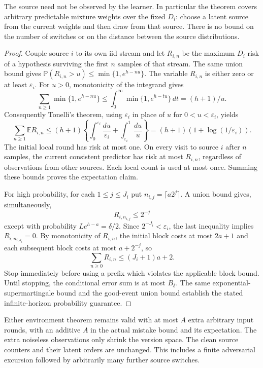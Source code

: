 The source need not be observed by the learner. In particular the theorem
covers arbitrary predictable mixture weights over the fixed $D_i$: choose
a latent source from the current weights and then draw from that source.
There is no bound on the number of switches or on the distance between
the source distributions.

\begin{proof}
Couple source $i$ to its own iid stream and let $R_{i,n}$ be the maximum
$D_i$-risk of a hypothesis surviving the first $n$ samples of that stream.
The same union bound gives
$\mathbb P(R_{i,n}>u)\le\min\{1,e^{h-nu}\}$.
The variable $R_{i,n}$ is either zero or at least $\varepsilon_i$.
For $u>0$, monotonicity of the integrand gives
\[
 \sum_{n\ge1}\min\{1,e^{h-nu}\}
 \le\int_0^\infty\min\{1,e^{h-tu}\}\,dt=(h+1)/u.
\]
Consequently Tonelli's theorem, using $\varepsilon_i$ in place of $u$
for $0<u<\varepsilon_i$, yields
\[
 \sum_{n\ge1}\mathbb E R_{i,n}
 \le(h+1)\left\{\int_0^{\varepsilon_i}\frac{du}{\varepsilon_i}
                   +\int_{\varepsilon_i}^1\frac{du}{u}\right\}
 =(h+1)(1+\log(1/\varepsilon_i)).
\]
The initial local round has risk at most one. On every visit to source $i$
after $n$ samples, the current consistent predictor has risk at most
$R_{i,n}$, regardless of observations from other sources. Each local count
is used at most once. Summing these bounds proves the expectation claim.

For high probability, for each $1\le j\le J_i$ put
$n_{i,j}=\lceil a2^j\rceil$. A union bound gives, simultaneously,
\[
 R_{i,n_{i,j}}\le2^{-j}
\]
except with probability $Le^{h-a}=\delta/2$. Since
$2^{-J_i}<\varepsilon_i$, the last inequality implies
$R_{i,n_{i,J_i}}=0$. By monotonicity of $R_{i,n}$, the initial block costs
at most $2a+1$ and each subsequent block costs at most $a+2^{-j}$, so
\[
 \sum_{n\ge0}R_{i,n}\le(J_i+1)a+2.
\]
Stop immediately before using a prefix which violates the applicable
block bound. Until stopping, the conditional error sum is at most
$B_\delta$. The same exponential-supermartingale bound and the good-event
union bound establish the stated infinite-horizon probability guarantee.
\end{proof}

\begin{remark}
Either environment theorem remains valid with at most $A$ extra arbitrary
input rounds, with an additive $A$ in the actual mistake bound and its
expectation. The extra noiseless observations only shrink the version
space. The clean source counters and their latent orders are unchanged.
This includes a finite adversarial excursion followed by arbitrarily
many further source switches.
\end{remark}


